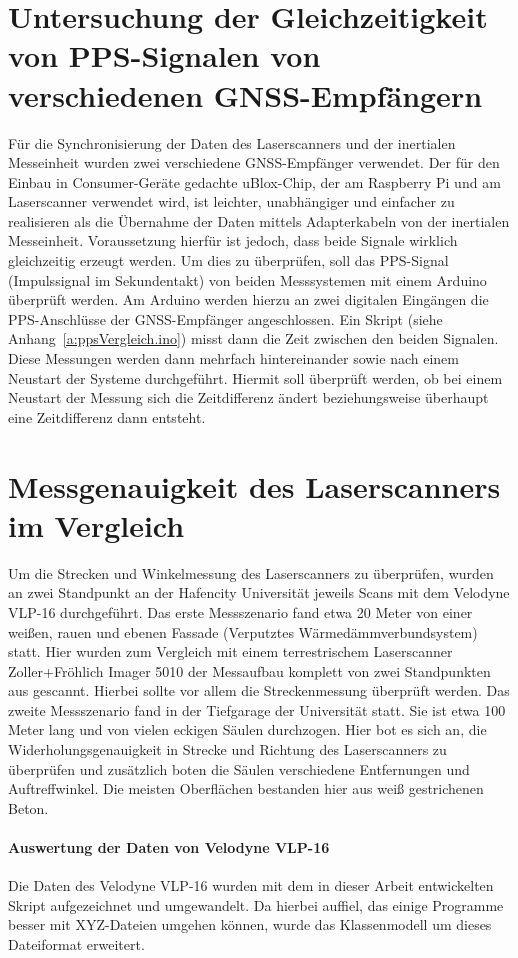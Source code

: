 \documentclass[a4paper,12pt,bibliography=totoc, listof=totoc,titlepage,pointlessnumbers]{scrreprt}
\begin{document}
\section{Untersuchung der Gleichzeitigkeit von PPS-Signalen von verschiedenen GNSS-Empfängern}
Für die Synchronisierung der Daten des Laser\-scan\-ners und der inertialen Messeinheit wurden zwei verschiedene GNSS-Empfänger verwendet. Der für den Einbau in Consumer-Geräte gedachte uBlox-Chip, der am Raspberry Pi und am Laser\-scan\-ner verwendet wird, ist leichter, unabhängiger und einfacher zu realisieren als die Übernahme der Daten mittels Adapterkabeln von der inertialen Messeinheit. Voraussetzung hierfür ist jedoch, dass beide Signale wirklich gleichzeitig erzeugt werden. Um dies zu überprüfen, soll das PPS-Signal (Impulssignal im Sekundentakt) von beiden Messsystemen mit einem Arduino überprüft werden.
Am Arduino werden hierzu an zwei digitalen Eingängen die PPS-Anschlüsse der GNSS-Empfänger angeschlossen. Ein Skript (siehe Anhang~\ref{a:ppsVergleich.ino}) misst dann die Zeit zwischen den beiden Signalen. Diese Messungen werden dann mehrfach hintereinander sowie nach einem Neustart der Systeme durchgeführt. Hiermit soll überprüft werden, ob bei einem Neustart der Messung sich die Zeitdifferenz ändert beziehungsweise überhaupt eine Zeitdifferenz dann entsteht.


\section{Messgenauigkeit des Laser\-scan\-ners im Vergleich}
Um die Strecken und Winkelmessung des Laserscanners zu überprüfen, wurden an zwei Standpunkt an der Hafencity Universität jeweils Scans mit dem Velodyne VLP-16 durchgeführt. Das erste Messszenario fand etwa 20 Meter von einer weißen, rauen und ebenen Fassade (Verputztes Wärmedämmverbundsystem) statt. Hier wurden zum Vergleich mit einem terrestrischem Laserscanner Zoller+Fröhlich Imager 5010 der Messaufbau komplett von zwei Standpunkten aus gescannt. Hierbei sollte vor allem die Streckenmessung überprüft werden. Das zweite Messszenario fand in der Tiefgarage der Universität statt. Sie ist etwa 100 Meter lang und von vielen eckigen Säulen durchzogen. Hier bot es sich an, die Widerholungsgenauigkeit in Strecke und Richtung des Laserscanners zu überprüfen und zusätzlich boten die Säulen verschiedene Entfernungen und Auftreffwinkel. Die meisten Oberflächen bestanden hier aus weiß gestrichenen Beton.

\paragraph{Auswertung der Daten von Velodyne VLP-16}
Die Daten des Velodyne VLP-16 wurden mit dem in dieser Arbeit entwickelten Skript aufgezeichnet und umgewandelt. Da hierbei auffiel, das einige Programme besser mit XYZ-Dateien umgehen können, wurde das Klassenmodell um dieses Dateiformat erweitert.
\end{document}
